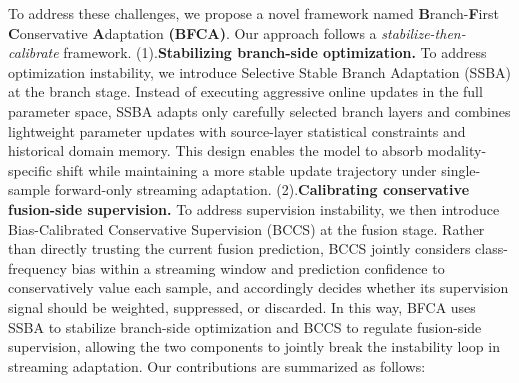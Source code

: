 To address these challenges, we propose a novel framework named
\textbf{B}ranch-\textbf{F}irst \textbf{C}onservative \textbf{A}daptation \textbf{(BFCA)}.
Our approach follows a \emph{stabilize-then-calibrate} framework.
(1).\textbf{Stabilizing branch-side optimization.}
To address optimization instability, we introduce Selective Stable Branch Adaptation (SSBA) at the branch stage.
Instead of executing aggressive online updates in the full parameter space, SSBA adapts only carefully selected branch layers and combines lightweight parameter updates with source-layer statistical constraints and historical domain memory.
This design enables the model to absorb modality-specific shift while maintaining a more stable update trajectory under single-sample forward-only streaming adaptation.
(2).\textbf{Calibrating conservative fusion-side supervision.}
To address supervision instability, we then introduce Bias-Calibrated Conservative Supervision (BCCS) at the fusion stage.
Rather than directly trusting the current fusion prediction, BCCS jointly considers class-frequency bias within a streaming window and prediction confidence to conservatively value each sample, and accordingly decides whether its supervision signal should be weighted, suppressed, or discarded.
In this way, BFCA uses SSBA to stabilize branch-side optimization and BCCS to regulate fusion-side supervision, allowing the two components to jointly break the instability loop in streaming adaptation. Our contributions are summarized as follows:

